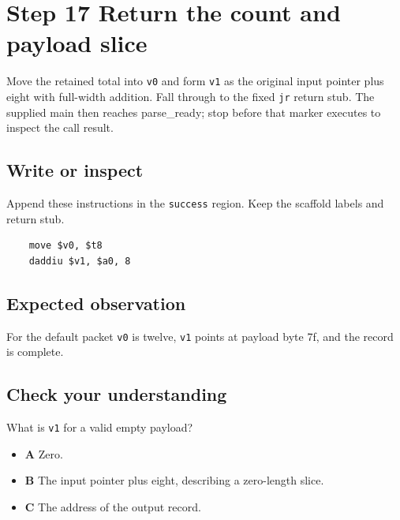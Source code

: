 \section{Step 17 Return the count and payload slice}\label{packet-s17}

Move the retained total into \texttt{v0} and form \texttt{v1} as the original input pointer plus eight with full-width addition. Fall through to the fixed \texttt{jr} return stub. The supplied main then reaches parse\_ready; stop before that marker executes to inspect the call result.

\subsection{Write or inspect}
Append these instructions in the \texttt{success} region. Keep the scaffold labels and return stub.

\begin{verbatim}
    move $v0, $t8
    daddiu $v1, $a0, 8
\end{verbatim}

\subsection{Expected observation}
For the default packet \texttt{v0} is twelve, \texttt{v1} points at payload byte 7f, and the record is complete.

\subsection{Check your understanding}
What is \texttt{v1} for a valid empty payload?

\begin{itemize}
  \item \textbf{A} Zero.
  \item \textbf{B} The input pointer plus eight, describing a zero-length slice.
  \item \textbf{C} The address of the output record.
\end{itemize}
